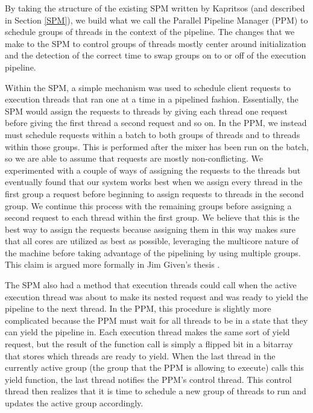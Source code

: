 \documentclass[11pt, oneside]{report}
\begin{document}
By taking the structure of the existing SPM written by Kapritsos (and described in Section \ref{SPM}), we build what we call the Parallel Pipeline Manager (PPM) to schedule groups of threads in the context of the pipeline. 
The changes that we make to the SPM to control groups of threads mostly center around initialization and the detection of the correct time to swap groups on to or off of the execution pipeline.

Within the SPM, a simple mechanism was used to schedule client requests to execution threads that ran one at a time in a pipelined fashion. 
Essentially, the SPM would assign the requests to threads by giving each thread one request before giving the first thread a second request and so on. 
In the PPM, we instead must schedule requests within a batch to both groups of threads and to threads within those groups. 
This is performed after the mixer has been run on the batch, so we are able to assume that requests are mostly non-conflicting. 
We experimented with a couple of ways of assigning the requests to the threads but eventually found that our system works best when we assign every thread in the first group a request before beginning to assign requests to threads in the second group.
We continue this process with the remaining groups before assigning a second request to each thread within the first group. 
We believe that this is the best way to assign the requests because assigning them in this way makes sure that all cores are utilized as best as possible, leveraging the multicore nature of the machine before taking advantage of the pipelining by using multiple groups. This claim is argued more formally in Jim Given's thesis \cite{jim}.

The SPM also had a method that execution threads could call when the active execution thread was about to make its nested request and was ready to yield the pipeline to the next thread. 
In the PPM, this procedure is slightly more complicated because the PPM must wait for all threads to be in a state that they can yield the pipeline in. 
Each execution thread makes the same sort of yield request, but the result of the function call is simply a flipped bit in a bitarray that stores which threads are ready to yield. 
When the last thread in the currently active group (the group that the PPM is allowing to execute) calls this yield function, the last thread notifies the PPM's control thread.
This control thread then realizes that it is time to schedule a new group of threads to run and updates the active group accordingly. 
\end{document}
